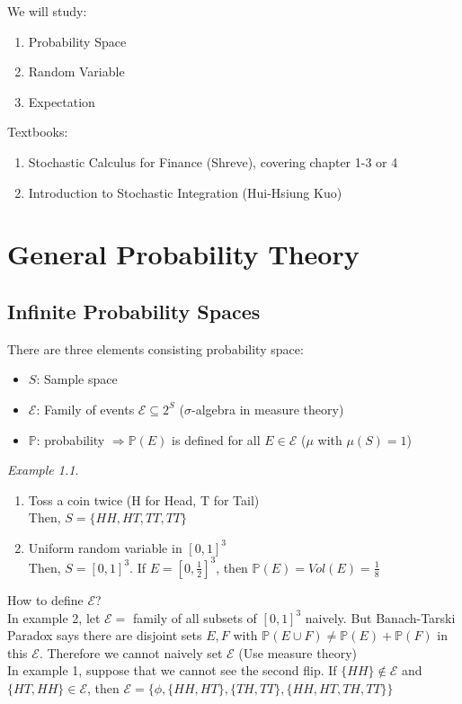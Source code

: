 \documentclass[12pt]{report}
\renewcommand{\subset}{\subseteq}
\newcommand{\RNum}[1]{\uppercase\expandafter{\romannumeral #1\relax}}
\theoremstyle{break}
\theoremstyle{newdef}
\theoremstyle{remark}
\newtheorem*{exmp}{Example} %
\begin{document}
We will study:
\begin{enumerate}
\item Probability Space
\item Random Variable
\item Expectation
\end{enumerate}

Textbooks:
\begin{enumerate}
\item Stochastic Calculus for Finance \RNum{2} (Shreve), covering chapter 1-3 or 4
\item Introduction to Stochastic Integration (Hui-Hsiung Kuo)
\end{enumerate}



\chapter{General Probability Theory}
\section{Infinite Probability Spaces}
There are three elements consisting probability space:
\begin{itemize}
\item $S$: Sample space
\item $\mathcal{E}$: Family of events $\mathcal{E} \subset 2^S$ ($\sigma$-algebra in measure theory)
\item $\mathbb{P}$: probability $\Rightarrow \mathbb{P}(E)$ is defined for all $E \in \mathcal{E}$ ($\mu$ with $\mu(S)=1$)
\end{itemize}

\begin{exmp}
\begin{minipage}[t]{\linegoal}
\begin{enumerate}
\item Toss a coin twice (H for Head, T for Tail)\\
Then, $S = \{HH, HT, TT, TT\}$
\item Uniform random variable in $[0,1]^3$\\
Then, $S = [0,1]^3$.
If $E = [0,\frac{1}{2}]^3$, then $\mathbb{P}(E) = Vol(E) = \frac{1}{8}$\\
\end{enumerate}
\end{minipage}

How to define $\mathcal{E}$?\\
In example 2, let $\mathcal{E} = $ family of all subsets of $[0,1]^3$ naively.
But Banach-Tarski Paradox says there are disjoint sets $E,F$ with $\mathbb{P}(E\cup F) \neq \mathbb{P}(E) + \mathbb{P}(F)$ in this $\mathcal{E}$.
Therefore we cannot naively set $\mathcal{E}$ (Use measure theory)\\

In example 1, suppose that we cannot see the second flip.
If $\{HH\} \not\in \mathcal{E}$ and $\{HT, HH\}\in\mathcal{E}$, then $\mathcal{E} = \{\phi, \{HH,HT\}, \{TH,TT\}, \{HH,HT,TH,TT\}\}$
\end{exmp}
\end{document}

